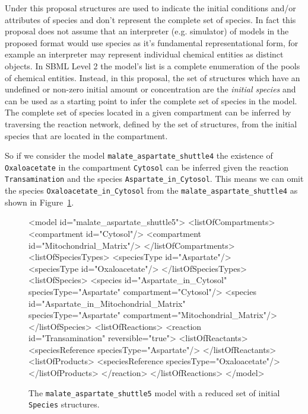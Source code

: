 \documentclass{cekarticle}
\begin{document}
Under this proposal  structures are used to indicate the initial conditions
and/or attributes of species and don't represent the complete
set of species.  In fact this proposal does not assume that an interpreter (e.g.
simulator) of models in the proposed format would use species as it's fundamental representational form,
for example an interpreter may represent individual chemical entities as distinct objects.
In SBML Level 2 the model's  list is a complete enumeration of the
pools of chemical entities.  Instead, in this proposal, the set of  structures
which have an undefined or non-zero initial amount or concentration are the \emph{initial species}
and can be used as a starting point to infer the complete set of species in the model.
The complete set of species located in a given compartment can be inferred by traversing the reaction
network, defined by the set of  structures, from the initial species that are located
in the compartment.

So if we consider the model \texttt{malate\_aspartate\_shuttle4} the existence of
\texttt{Oxaloacetate} in the compartment \texttt{Cytosol} can be inferred given the reaction
\texttt{Transamination} and the species \texttt{Aspartate\_in\_Cytosol}.  This means we can omit
the species \texttt{Oxaloacetate\_in\_Cytosol} from the \texttt{malate\_aspartate\_shuttle4} as shown
in Figure~\ref{fig:malate_aspartate_shuttle5-xml}.

\begin{figure}[h]
\begin{example}
<model id="malate_aspartate_shuttle5">
    <listOfCompartments>
        <compartment id="Cytosol"/>
        <compartment id="Mitochondrial_Matrix"/>
    </listOfCompartments>
    <listOfSpeciesTypes>
        <speciesType id="Aspartate"/>
        <speciesType id="Oxaloacetate"/>
    </listOfSpeciesTypes>
    <listOfSpecies>
        <species
            id="Aspartate_in_Cytosol"
            speciesType="Aspartate"
            compartment="Cytosol"/>
        <species
            id="Aspartate_in_Mitochondrial_Matrix"
            speciesType="Aspartate"
            compartment="Mitochondrial_Matrix"/>
    </listOfSpecies>
    <listOfReactions>
        <reaction id="Transamination" reversible="true">
            <listOfReactants>
                <speciesReference speciesType="Aspartate"/>
            </listOfReactants>
            <listOfProducts>
                <speciesReference speciesType="Oxaloacetate"/>
            </listOfProducts>
        </reaction>
    </listOfReactions>
</model>
\end{example}
\caption{The \texttt{malate\_aspartate\_shuttle5} model with a reduced set of initial \texttt{Species}
structures.}
\label{fig:malate_aspartate_shuttle5-xml}
\end{figure}
\end{document}
